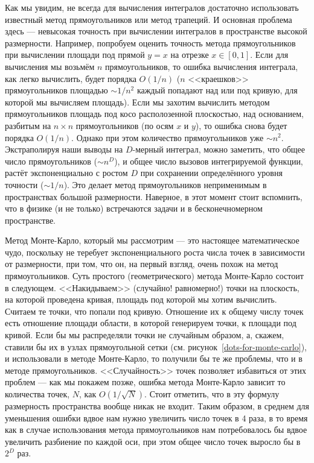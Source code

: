 \documentclass{book}
\begin{document}
Как мы увидим, не всегда для вычисления интегралов достаточно использовать известный метод
прямоугольников или метод трапеций. И основная проблема здесь --- невысокая точность при вычислении
интегралов в пространстве высокой размерности. Например, попробуем оценить точность метода
прямоугольников при вычислении площади под прямой $y = x$ на отрезке $x \in [0, 1]$. Если для
вычисления мы возьмём $n$ прямоугольников, то ошибка вычисления интеграла, как легко вычислить,
будет порядка $O(1/n)$ ($n$ <<краешков>> прямоугольников площадью $\sim 1/n^2$ каждый попадают над
или под кривую, для которой мы вычисляем площадь). Если мы захотим вычислить методом
прямоугольников площадь под косо располозенной плоскостью, над основанием, разбитым на $n \times n$
прямоугольников (по осям $x$ и $y$), то ошибка снова будет порядка $O(1/n)$. Однако при этом
количество прямоугольников уже $\sim n^2$. Экстраполируя наши выводы на $D$-мерный интеграл, можно
заметить, что общее число прямоугольников ($\sim n^D$), и общее число вызовов интегрируемой
функции, растёт экспоненциально с ростом $D$ при сохранении определённого уровня точности ($\sim
1/n$). Это делает метод прямоугольников неприменимым в пространствах большой размерности. Наверное,
в этот момент стоит вспомнить, что в физике (и не только) встречаются задачи и в бесконечномерном
пространстве.

Метод Монте-Карло, который мы рассмотрим --- это настоящее математическое чудо, поскольку не
теребует экспоненциального роста числа точек в зависимости от размерности, при том, что он, на
первый взгляд, очень похож на метод прямоугольников. Суть простого (геометрического) метода
Монте-Карло состоит в следующем.  <<Накидываем>> (случайно! равномерно!) точки на плоскость, на
которой проведена кривая, площадь под которой мы хотим вычислить. Считаем те точки, что попали под
кривую. Отношение их к общему числу точек есть отношение площади области, в которой генерируем
точки, к площади под кривой. Если бы мы распределяли точки не случайным образом, а, скажем, ставили
бы их в узлах прямоугольной сетки (см. рисунок~\ref{dots-for-monte-carlo}), и использовали в методе
Монте-Карло, то получили бы те же проблемы, что и в методе прямоугольников.  <<Случайность>> точек
позволяет избавиться от этих проблем --- как мы покажем позже, ошибка метода Монте-Карло зависит то
количества точек, $N$, как $O(1/\sqrt{N})$. Стоит отметить, что в эту формулу размерность
пространства вообще никак не входит.  Таким образом, в среднем для уменьшения ошибки вдвое нам
нужно увеличить число точек в 4 раза, в то время как в случае использования метода прямоугольников
нам потребовалось бы вдвое увеличить разбиение по каждой оси, при этом общее число точек выросло бы
в $2^D$ раз.
\end{document}
